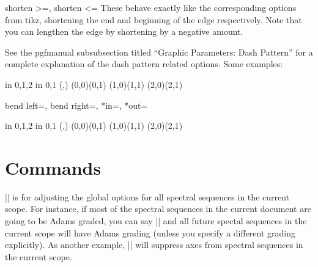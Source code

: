 \documentclass{ltxdoc}
\newenvironment{manualentry}[1]{
    \begin{pgfmanualentry}
    \pgfmanualentryheadline{#1}
    \pgfmanualbody
}{
    \end{pgfmanualentry}
}
\begin{document}
\begin{sseqdata}[name=ex1,degree={#1}{1-#1}]
\begin{keylist}{shorten >=, shorten <=}
These behave exactly like the corresponding options from tikz, shortening the end and beginning of the edge respectively. Note that you can lengthen the edge by shortening by a negative amount.
\end{keylist}

\begin{manualentry}{Dash patterns:}
See the pgfmanual subsubsection titled ``Graphic Parameters: Dash Pattern'' for a complete explanation of the dash pattern related options. Some examples:
\begin{codeexample}[]
\begin{sseqpage}[no axes]
\foreach\x in {0,1,2} \foreach\y in {0,1}{
    \class(\x,\y)
}
(0,0)(0,1)
(1,0)(1,1)
(2,0)(2,1)
\end{sseqpage}
\end{codeexample}
%
\end{manualentry}

\begin{keylist}{bend left=, bend right=, *in=, *out=}
\begin{codeexample}[]
\begin{sseqpage}[no axes]
\foreach\x in {0,1,2} \foreach\y in {0,1}{
    \class(\x,\y)
}
\structline[bend left=20](0,0)(0,1)
\structline[bend right=20](1,0)(1,1)
\structline[in=20,out=north](2,0)(2,1)
\end{sseqpage}
\end{codeexample}
\end{keylist}


\section{Commands}
\begin{command}{\sseqset{}}
|\sseqset| is for adjusting the global options for all spectral sequences in the current scope. For instance, if most of the spectral sequences in the current document are going to be Adams graded, you can say || and all future spectal sequences in the current scope will have Adams grading (unless you specify a different grading explicitly). As another example, || will suppress axes from spectral sequences in the current scope.
\end{command}


\end{sseqdata}
\end{document}
